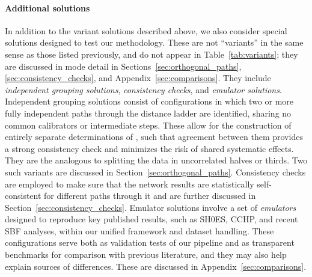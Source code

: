 \paragraph {Additional solutions}  In addition to the variant solutions described above, we also consider special solutions designed to test our methodology. These are not ``variants'' in the same sense as those listed previously, and do not appear in Table~\ref{tab:variants}; they are discussed in mode detail in Sections~\ref{sec:orthogonal_paths}, \ref{sec:consistency_checks}, and Appendix~\ref{sec:comparisons}.  They include \textit{independent grouping solutions}, \textit{consistency checks}, and \textit {emulator solutions}.  Independent grouping solutions consist of configurations in which two or more fully independent paths through the distance ladder are identified, sharing no common calibrators or intermediate steps. These allow for the construction of entirely separate determinations of {\Hcst}, such that agreement between them provides a strong consistency check and minimizes the risk of shared systematic effects. They are the analogous to splitting the data in uncorrelated halves or thirds. Two such variants are discussed in Section~\ref{sec:orthogonal_paths}.  Consistency checks are employed to make sure that the network results are statistically self-consistent for different paths through it and are further discussed in Section~\ref{sec:consistency_checks}.  Emulator solutions involve a set of \textit{emulators} designed to reproduce key published results, such as SH0ES, CCHP, and recent SBF analyses, within our unified framework and dataset handling. These configurations serve both as validation tests of our pipeline and as transparent benchmarks for comparison with previous literature, and they may also help explain sources of differences. These are discussed in Appendix~\ref{sec:comparisons}.

